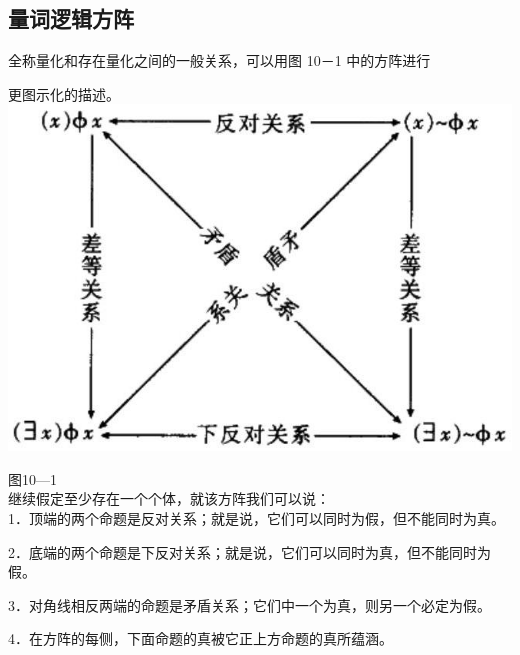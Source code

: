 \subsection{量词逻辑方阵}

全称量化和存在量化之间的一般关系，可以用图 10－1 中的方阵进行

更图示化的描述。\\
\includegraphics[width=\textwidth]{images/2025_05_15_6a28331d5e7c993ad07ag-463.jpg}

图10—1\\
继续假定至少存在一个个体，就该方阵我们可以说：\\
1．顶端的两个命题是反对关系；就是说，它们可以同时为假，但不能同时为真。

2．底端的两个命题是下反对关系；就是说，它们可以同时为真，但不能同时为假。

3．对角线相反两端的命题是矛盾关系；它们中一个为真，则另一个必定为假。

4．在方阵的每侧，下面命题的真被它正上方命题的真所蕴涵。

